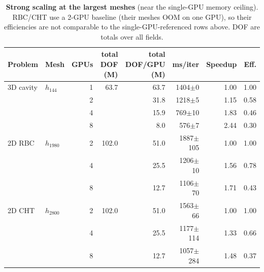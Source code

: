 \begin{table}[ht]
\centering
\caption{\textbf{Strong scaling at the largest meshes} (near the single-GPU memory ceiling). RBC/CHT use a 2-GPU baseline (their meshes OOM on one GPU), so their efficiencies are not comparable to the single-GPU-referenced rows above. DOF are totals over all fields.}
\label{tab:strongmax}
\small\setlength{\tabcolsep}{4pt}
\begin{tabular}{llrrrrrr}
\toprule
Problem & Mesh & GPUs & total DOF (M) & total DOF/GPU (M) & ms/iter & Speedup & Eff. \\
\midrule
3D cavity & $h_{144}$ & 1 & 63.7 & 63.7 & 1404$\pm$0 & 1.00 & 1.00 \\
 &  & 2 &  & 31.8 & 1218$\pm$5 & 1.15 & 0.58 \\
 &  & 4 &  & 15.9 & 769$\pm$10 & 1.83 & 0.46 \\
 &  & 8 &  & 8.0 & 576$\pm$7 & 2.44 & 0.30 \\
\midrule
2D RBC & $h_{1980}$ & 2 & 102.0 & 51.0 & 1887$\pm$105 & 1.00 & 1.00 \\
 &  & 4 &  & 25.5 & 1206$\pm$10 & 1.56 & 0.78 \\
 &  & 8 &  & 12.7 & 1106$\pm$70 & 1.71 & 0.43 \\
\midrule
2D CHT & $h_{2800}$ & 2 & 102.0 & 51.0 & 1563$\pm$66 & 1.00 & 1.00 \\
 &  & 4 &  & 25.5 & 1177$\pm$114 & 1.33 & 0.66 \\
 &  & 8 &  & 12.7 & 1057$\pm$284 & 1.48 & 0.37 \\
\bottomrule
\end{tabular}
\end{table}

